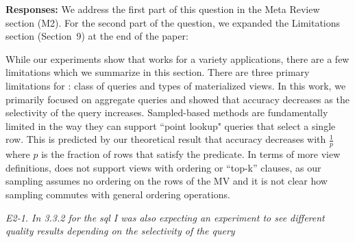 {\bf Responses:} We address the first part of this question in the Meta Review section (M2). For the second part of the question, we expanded the Limitations section (Section~9) at the end of the paper:
\begin{displayquote}
While our experiments show that \svc works for a variety applications, there are a few limitations which we summarize in this section.
There are three primary limitations for \svc: class of queries and types of materialized views. 
In this work, we primarily focused on aggregate queries and showed that accuracy decreases as the selectivity of the query increases.
Sampled-based methods are fundamentally limited in the way they can support ``point lookup" queries that select a single row.
This is predicted by our theoretical result that accuracy decreases with $\frac{1}{p}$ where $p$ is the fraction of rows that satisfy the predicate.
In terms of more view definitions, \svc does not support views with ordering or ``top-k'' clauses, as our sampling assumes no ordering on the rows of the MV and it is not clear how sampling commutes with general ordering operations.
\end{displayquote}

\emph{E2-1. In 3.3.2 for the sql I was also expecting an experiment to see different quality results depending on the selectivity of the query}

\vspace{.25em}

